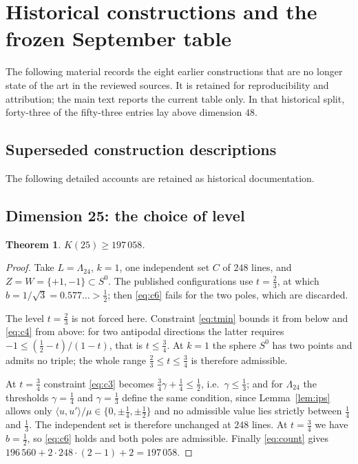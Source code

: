 \documentclass[11pt]{amsart}
\newtheorem{theorem}{Theorem}[section]
\theoremstyle{remark}
\newcommand{\Leech}{\Lambda_{24}}
\newcommand{\ip}[2]{\langle #1,#2\rangle}
\begin{document}
\section{Historical constructions and the frozen September table}\label{app:historical}

The following material records the eight earlier constructions that are no
longer state of the art in the reviewed sources. It is retained for
reproducibility and attribution; the main text reports the current table only.
In that historical split, forty-three of the fifty-three entries lay above
dimension $48$.

\subsection{Superseded construction descriptions}

The following detailed accounts are retained as historical documentation.

\subsection{Dimension 25: the choice of level}\label{ss:d25}

\begin{theorem}\label{thm:25}
$K(25)\ge197\,058$.
\end{theorem}

\begin{proof}
Take $L=\Leech$, $k=1$, one independent set $C$ of $248$ lines, and
$Z=W=\{+1,-1\}\subset S^{0}$. The published configurations use $t=\tfrac23$, at
which $b=1/\sqrt3=0.577\ldots>\tfrac12$; then \eqref{eq:c6} fails for the two
poles, which are discarded.

The level $t=\tfrac23$ is not forced here. Constraint \eqref{eq:tmin} bounds it
from below and \eqref{eq:c4} from above: for two antipodal directions the latter
requires $-1\le(\tfrac12-t)/(1-t)$, that is $t\le\tfrac34$. At $k=1$
the sphere $S^0$ has two points and admits no triple; the whole range
$\tfrac23\le t\le\tfrac34$ is therefore admissible.

At $t=\tfrac34$ constraint \eqref{eq:c3} becomes $\tfrac34\gamma+\tfrac14
\le\tfrac12$, i.e.\ $\gamma\le\tfrac13$; and for $\Leech$ the thresholds
$\gamma=\tfrac14$ and $\gamma=\tfrac13$ define the same condition, since
Lemma~\ref{lem:ips} allows only $\ip{u}{u'}/\mu\in\{0,\pm\tfrac14,\pm\tfrac12\}$
and no admissible value lies strictly between $\tfrac14$ and $\tfrac13$. The
independent set is therefore unchanged at $248$ lines. At $t=\tfrac34$ we have
$b=\tfrac12$, so \eqref{eq:c6} holds and both poles are admissible. Finally
\eqref{eq:count} gives
$196\,560+2\cdot248\cdot(2-1)+2=197\,058$.
\end{proof}
\end{document}
